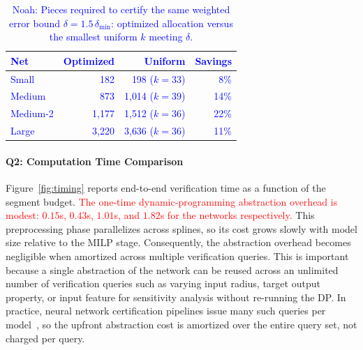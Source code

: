   \begin{table}[t]
    \caption{\textcolor{blue}{Noah: Pieces required to certify the same weighted error bound $\delta = 1.5\,\delta_{\min}$: optimized allocation versus the smallest uniform $k$ meeting $\delta$.}}
    \label{tab:eqerror}
    \centering
    \textcolor{blue}{
    \begin{tabular}{lrrr}
    \hline
    Net & Optimized & Uniform & Savings \\
    \hline
    Small    & 182 & 198 ($k=33$) & 8\% \\
    Medium   & 873 & 1{,}014 ($k=39$) & 14\% \\
    Medium-2 & 1{,}177 & 1{,}512 ($k=36$) & 22\% \\
    Large    & 3{,}220 & 3{,}636 ($k=36$) & 11\% \\
    \hline
    \end{tabular}}
  \end{table}


\paragraph{\textbf{Q2: Computation Time Comparison}}

Figure~\ref{fig:timing} reports end-to-end verification time as a function of the segment budget. \textcolor{red}{The one-time dynamic-programming abstraction overhead is modest: $0.15$s, $0.43$s, $1.01$s, and $1.82$s for the networks respectively.} This preprocessing phase parallelizes across splines, so its cost grows slowly with model size relative to the MILP stage. Consequently, the abstraction overhead becomes negligible when amortized across multiple verification queries. This is important because a single abstraction of the network can be reused across an unlimited number of verification queries such as varying input radius, target output property, or input feature for sensitivity analysis without re-running the DP. In practice, neural network certification pipelines issue many such queries per model~\cite{SinghEtAl2019AbstractDomain}, so the upfront abstraction cost is amortized over the entire query set, not charged per query.

